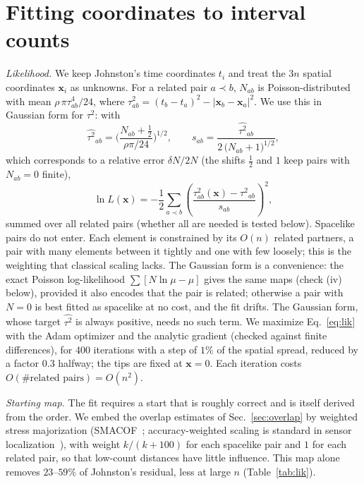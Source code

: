 \documentclass[prd,twocolumn,superscriptaddress,nofootinbib,amsmath,amssymb,floatfix]{revtex4-2}
\begin{document}
\section{Fitting coordinates to interval counts}\label{sec:likelihood}
\emph{Likelihood.} We keep Johnston's time coordinates $t_i$ and treat the $3n$ spatial coordinates $\mathbf x_i$ as unknowns. For a related pair $a\prec b$, $N_{ab}$ is Poisson-distributed with mean $\rho\,\pi\tau_{ab}^4/24$, where $\tau_{ab}^2=(t_b-t_a)^2-|\mathbf x_b-\mathbf x_a|^2$. We use this in Gaussian form for $\tau^2$: with
\begin{equation}
\widehat{\tau^2}_{ab}=\Big(\frac{N_{ab}+\tfrac12}{\rho\pi/24}\Big)^{1/2},\qquad s_{ab}=\frac{\widehat{\tau^2}_{ab}}{2\,\big(N_{ab}+1\big)^{1/2}},
\end{equation}
which corresponds to a relative error $\delta N/2N$ (the shifts $\tfrac12$ and $1$ keep pairs with $N_{ab}=0$ finite),
\begin{equation}
\ln L(\mathbf x)=-\frac12\sum_{a\prec b}\left(\frac{\tau^2_{ab}(\mathbf x)-\widehat{\tau^2}_{ab}}{s_{ab}}\right)^{2},
\label{eq:lik}
\end{equation}
summed over all related pairs (whether all are needed is tested below). Spacelike pairs do not enter. Each element is constrained by its $O(n)$ related partners, a pair with many elements between it tightly and one with few loosely; this is the weighting that classical scaling lacks. The Gaussian form is a convenience: the exact Poisson log-likelihood $\sum[N\ln\mu-\mu]$ gives the same maps (check (iv) below), provided it also encodes that the pair is related; otherwise a pair with $N=0$ is best fitted as spacelike at no cost, and the fit drifts. The Gaussian form, whose target $\widehat{\tau^2}$ is always positive, needs no such term. We maximize Eq.~\eqref{eq:lik} with the Adam optimizer and the analytic gradient (checked against finite differences), for 400 iterations with a step of $1\%$ of the spatial spread, reduced by a factor $0.3$ halfway; the tips are fixed at $\mathbf x=0$. Each iteration costs $O(\#\text{related pairs})=O(n^2)$.

\emph{Starting map.} The fit requires a start that is roughly correct and is itself derived from the order. We embed the overlap estimates of Sec.~\ref{sec:overlap} by weighted stress majorization (SMACOF~\cite{deLeeuwMair09}; accuracy-weighted scaling is standard in sensor localization~\cite{CostaPatwariHero06}), with weight $k/(k+100)$ for each spacelike pair and $1$ for each related pair, so that low-count distances have little influence. This map alone removes $23$--$59\%$ of Johnston's residual, less at large $n$ (Table~\ref{tab:lik}).
\end{document}
